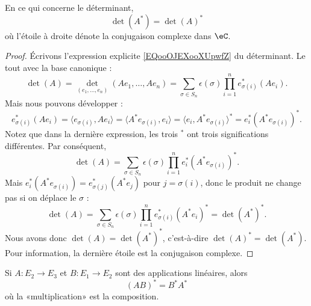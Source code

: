 \begin{proposition}     \label{PROPooSHZMooGwdfBd}
    En ce qui concerne le déterminant,
    \begin{equation}
        \det(A^*)=\det(A)^*
    \end{equation}
    où l'étoile à droite dénote la conjugaison complexe dans \( \eC\).
\end{proposition}

\begin{proof}
    Écrivons l'expression explicite \eqref{EQooOJEXooXUpwfZ} du déterminant. Le tout avec la base canonique :
    \begin{equation}
            \det(A)=\det_{(e_1,\ldots, e_n)}(Ae_1,\ldots, Ae_n)=\sum_{\sigma\in S_n}\epsilon(\sigma)\prod_{i=1}^ne_{\sigma(i)}^*(Ae_i).
    \end{equation}
    Mais nous pouvons développer :
    \begin{equation}
        e^*_{\sigma(i)}(Ae_i)=\langle e_{\sigma(i)}, Ae_i\rangle =\langle A^*e_{\sigma(i)}, e_i\rangle =\langle e_i, A^*e_{\sigma(i)}\rangle^*=e_i^*(A^*e_{\sigma(i)})^*.
    \end{equation}
    Notez que dans la dernière expression, les trois \( {}^*\) ont trois significations différentes. Par conséquent,
    \begin{equation}
        \det(A)=\sum_{\sigma\in S_n}\epsilon(\sigma)\prod_{i=1}^{n}e_i^*(A^*e_{\sigma(i)})^*.
    \end{equation}
    Mais \( e_i^*(A^*e_{\sigma(i)})=e_{\sigma(j)}^*(A^*e_{j})\) pour \( j=\sigma(i)\), donc le produit ne change pas si on déplace le \( \sigma\) :
    \begin{equation}
        \det(A)=\sum_{\sigma\in S_n}\epsilon(\sigma)\prod_{i=1}^{n}e_{\sigma(i)}^*(A^*e_{i})^*=\det(A^*)^*.
    \end{equation}
    Nous avons donc \( \det(A)=\det(A^*)^*\), c'est-à-dire \( \det(A)^*=\det(A^*)\). Pour information, la dernière étoile est la conjugaison complexe.
\end{proof}

\begin{proposition}     \label{PROPooVPSYooRuoEFi}
    Si \( A\colon E_2\to E_3\) et \( B\colon E_1\to E_2\) sont des applications linéaires, alors
    \begin{equation}
        (AB)^*=B^*A^*
    \end{equation}
    où la «multiplication» est la composition.
\end{proposition}


